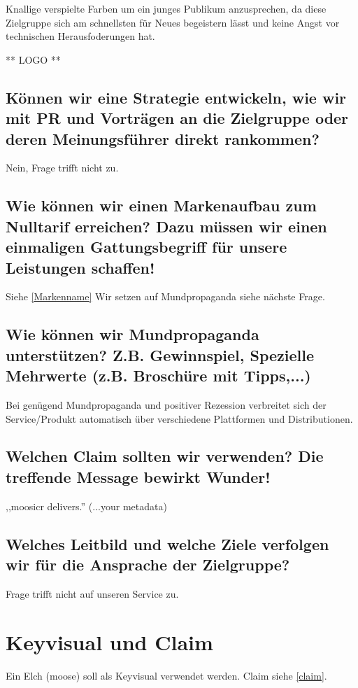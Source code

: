 \documentclass[11pt]{scrreprt}
\begin{document}
Knallige verspielte Farben um ein junges Publikum anzusprechen, da diese
Zielgruppe sich am schnellsten für Neues begeistern lässt und keine Angst vor
technischen Herausfoderungen hat.

** LOGO **

\section{Können wir eine Strategie entwickeln, wie wir
    mit PR und Vorträgen an die Zielgruppe oder
deren Meinungsführer direkt rankommen?}

Nein, Frage trifft nicht zu.

\section{Wie können wir einen Markenaufbau zum Nulltarif
    erreichen?
    Dazu müssen wir einen einmaligen Gattungsbegriff
für unsere Leistungen schaffen!}

Siehe \ref{Markenname} 
Wir setzen auf Mundpropaganda siehe nächste Frage.

\section{Wie können wir Mundpropaganda
    unterstützen?
    Z.B. Gewinnspiel, Spezielle Mehrwerte (z.B.
Broschüre mit Tipps,...)}
Bei genügend Mundpropaganda und positiver Rezession verbreitet sich der
Service/Produkt automatisch über verschiedene Plattformen und Distributionen.

\label{claim}\section{Welchen Claim sollten wir verwenden?
Die treffende Message bewirkt Wunder!}

,,moosicr delivers.'' (...your metadata)

\section{Welches Leitbild und welche Ziele verfolgen wir
für die Ansprache der Zielgruppe?}

Frage trifft nicht auf unseren Service zu.

\chapter{Keyvisual und Claim}
Ein Elch (moose) soll als Keyvisual verwendet werden. Claim siehe \ref{claim}.
\end{document}
